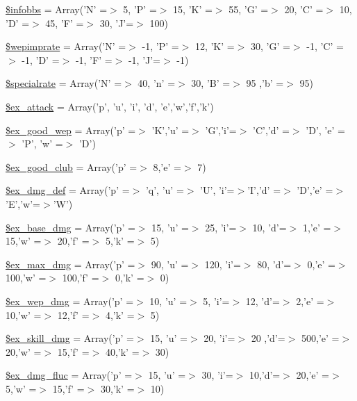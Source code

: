 \begin{DoxyCompactItemize}
\item 
\hyperlink{combatcfg__1_8php_a98ce8e2b93f331e535f1912e2b66aefd}{\$infobbs} = Array('N' =$>$ 5, 'P' =$>$ 15, 'K' =$>$ 55, 'G' =$>$ 20, 'C' =$>$ 10, 'D' =$>$ 45, 'F' =$>$ 30, 'J'=$>$ 100)
\item 
\hyperlink{combatcfg__1_8php_abcad788dd67419b2bf7d3f3e95ba884d}{\$wepimprate} = Array('N' =$>$ -\/1, 'P' =$>$ 12, 'K' =$>$ 30, 'G' =$>$ -\/1, 'C' =$>$ -\/1, 'D' =$>$ -\/1, 'F' =$>$ -\/1, 'J'=$>$ -\/1)
\item 
\hyperlink{combatcfg__1_8php_a713512757afc958b5469b5db12787304}{\$specialrate} = Array('N' =$>$ 40, 'n' =$>$ 30, 'B' =$>$ 95 ,'b' =$>$ 95)
\item 
\hyperlink{combatcfg__1_8php_af4c5e217c5117d40171c0f2862aa9875}{\$ex\+\_\+attack} = Array('p', 'u', 'i', 'd', 'e','w','f','k')
\item 
\hyperlink{combatcfg__1_8php_ad37de0fa5f7269157c4345e379d92128}{\$ex\+\_\+good\+\_\+wep} = Array('p' =$>$ 'K','u' =$>$ 'G','i'=$>$ 'C','d' =$>$ 'D', 'e' =$>$ 'P', 'w' =$>$ 'D')
\item 
\hyperlink{combatcfg__1_8php_a225b842cab48d7ce2dfbb0e305f9367f}{\$ex\+\_\+good\+\_\+club} = Array('p' =$>$ 8,'e' =$>$ 7)
\item 
\hyperlink{combatcfg__1_8php_ada41d88a06bdb3e9fe7ad54d02b14d7c}{\$ex\+\_\+dmg\+\_\+def} = Array('p' =$>$ 'q', 'u' =$>$ 'U', 'i'=$>$'I','d' =$>$ 'D','e' =$>$ 'E','w'=$>$'W')
\item 
\hyperlink{combatcfg__1_8php_acb8bfd04ad1a4a5af67fd08bac980a78}{\$ex\+\_\+base\+\_\+dmg} = Array('p' =$>$ 15, 'u' =$>$ 25, 'i'=$>$ 10, 'd'=$>$ 1,'e' =$>$ 15,'w' =$>$ 20,'f' =$>$ 5,'k' =$>$ 5)
\item 
\hyperlink{combatcfg__1_8php_abe8d9cfb9542e9143a593af2f79e6ea4}{\$ex\+\_\+max\+\_\+dmg} = Array('p' =$>$ 90, 'u' =$>$ 120, 'i'=$>$ 80, 'd'=$>$ 0,'e' =$>$ 100,'w' =$>$ 100,'f' =$>$ 0,'k' =$>$ 0)
\item 
\hyperlink{combatcfg__1_8php_aa25b77d6ee7c1987c1b4b887c53bab71}{\$ex\+\_\+wep\+\_\+dmg} = Array('p' =$>$ 10, 'u' =$>$ 5, 'i'=$>$ 12, 'd'=$>$ 2,'e' =$>$ 10,'w' =$>$ 12,'f' =$>$ 4,'k' =$>$ 5)
\item 
\hyperlink{combatcfg__1_8php_afe8309dffd15839d5eef23c95b70c72a}{\$ex\+\_\+skill\+\_\+dmg} = Array('p' =$>$ 15, 'u' =$>$ 20, 'i'=$>$ 20 ,'d'=$>$ 500,'e' =$>$ 20,'w' =$>$ 15,'f' =$>$ 40,'k' =$>$ 30)
\item 
\hyperlink{combatcfg__1_8php_a681401195cdfc0e0c016c1550ffee021}{\$ex\+\_\+dmg\+\_\+fluc} = Array('p' =$>$ 15, 'u' =$>$ 30, 'i'=$>$ 10,'d'=$>$ 20,'e' =$>$ 5,'w' =$>$ 15,'f' =$>$ 30,'k' =$>$ 10)

\end{DoxyCompactItemize}
